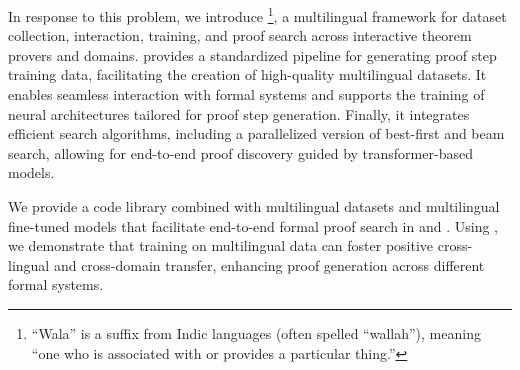 
In response to this problem, we introduce \proofwala\footnote{``Wala'' is a suffix from Indic languages (often spelled “wallah”), meaning ``one who is associated with or provides a particular thing.''}, a multilingual framework for dataset collection, interaction, training, and proof search across interactive theorem provers and domains. \name provides a standardized pipeline for generating proof step training data, facilitating the creation of high-quality multilingual datasets. It enables seamless interaction with formal systems and supports the training of neural architectures tailored for proof step generation. Finally, it integrates efficient search algorithms, including a parallelized version of best-first and beam search, allowing for end-to-end proof discovery guided by transformer-based models. 

We provide a code library combined with multilingual datasets and multilingual fine-tuned models that facilitate end-to-end formal proof search in \lean{} and \coq. Using \proofwala, we demonstrate that training on multilingual data can foster positive cross-lingual and cross-domain transfer, enhancing proof generation across different formal systems.

